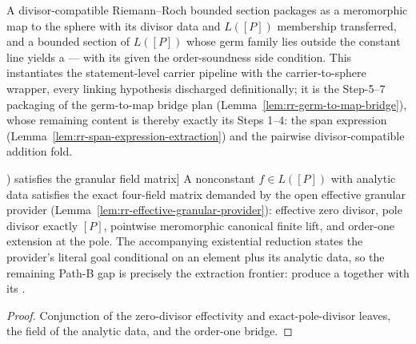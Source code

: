 \begin{lemma}
\label{lem:rr-bounded-section-to-sphere-map}
A divisor-compatible Riemann--Roch bounded section packages as a meromorphic
map to the sphere with its divisor data and \(L([P])\) membership
transferred, and a bounded section of \(L([P])\) whose germ family lies
outside the constant line yields a 
— with its  given the order-soundness side condition.
This instantiates the statement-level carrier pipeline with the
carrier-to-sphere wrapper, every linking hypothesis discharged
definitionally; it is the Step-5--7 packaging of the germ-to-map bridge plan
(Lemma~\ref{lem:rr-germ-to-map-bridge}), whose remaining content is thereby
exactly its Steps 1--4: the span expression
(Lemma~\ref{lem:rr-span-expression-extraction}) and the pairwise
divisor-compatible addition fold.
\leanok
\end{lemma}

\begin{lemma}[A nonconstant element of \(L([P])\) satisfies the granular field matrix]
\label{lem:rr-nonconstant-L-point-granular-fields}
A nonconstant \(f\in L([P])\) with analytic data satisfies the exact
four-field matrix demanded by the open effective granular provider
(Lemma~\ref{lem:rr-effective-granular-provider}): effective zero divisor,
pole divisor exactly \([P]\), pointwise meromorphic canonical finite lift,
and order-one extension at the pole. The accompanying existential reduction
 states the
provider's literal goal conditional on an element plus its analytic data, so
the remaining Path-B gap is precisely the extraction frontier: produce a
 together with its
.
\leanok
\end{lemma}
\begin{proof}\leanok
Conjunction of the zero-divisor effectivity and exact-pole-divisor leaves,
the  field of the analytic data, and the order-one
bridge.
\end{proof}

